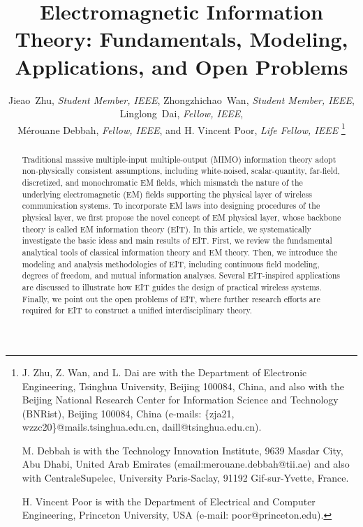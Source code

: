\documentclass[journal,twocolumn]{IEEEtran}
\begin{document}
\title{Electromagnetic Information Theory: Fundamentals, Modeling, Applications, and Open Problems}

\author{{Jieao~Zhu, {\textit{Student Member, IEEE}}, Zhongzhichao~Wan, {\textit{Student Member, IEEE}}, Linglong~Dai, {\textit{Fellow, IEEE}},\\
M\'{e}rouane Debbah, {\textit{Fellow, IEEE}}, and H. Vincent Poor, {\textit{Life Fellow, IEEE}} }
\thanks{J. Zhu, Z. Wan, and L. Dai are with the Department of Electronic Engineering, Tsinghua University, Beijing 100084, China, and also with the Beijing National Research Center for Information Science and Technology (BNRist), Beijing 100084, China (e-mails: \{zja21, wzzc20\}@mails.tsinghua.edu.cn, daill@tsinghua.edu.cn).

M. Debbah is with the Technology Innovation Institute, 9639 Masdar City, Abu Dhabi, United Arab Emirates (email:merouane.debbah@tii.ae) and also with CentraleSupelec, University Paris-Saclay, 91192 Gif-sur-Yvette, France. 

H. Vincent Poor is with the Department of Electrical and Computer Engineering, Princeton University, USA (e-mail: poor@princeton.edu).
}}

\maketitle

\begin{abstract}
	Traditional massive multiple-input multiple-output (MIMO) information theory adopt non-physically consistent assumptions, including white-noised, scalar-quantity, far-field, discretized, and monochromatic EM fields, which mismatch the nature of the underlying electromagnetic (EM) fields supporting the physical layer of wireless communication systems. 
	To incorporate EM laws into designing procedures of the physical layer, we first propose the novel concept of EM physical layer, whose backbone theory is called EM information theory (EIT). 
 	In this article, we systematically investigate the basic ideas and main results of EIT. First, we review the fundamental analytical tools of classical information theory and EM theory. Then, we introduce the modeling and analysis methodologies of EIT, including continuous field modeling, degrees of freedom, and mutual information analyses. Several EIT-inspired applications are discussed to illustrate how EIT guides the design of practical wireless systems. Finally, we point out the open problems of EIT, where further research efforts are required for EIT to construct a unified interdisciplinary theory. 
\end{abstract}
\end{document}
